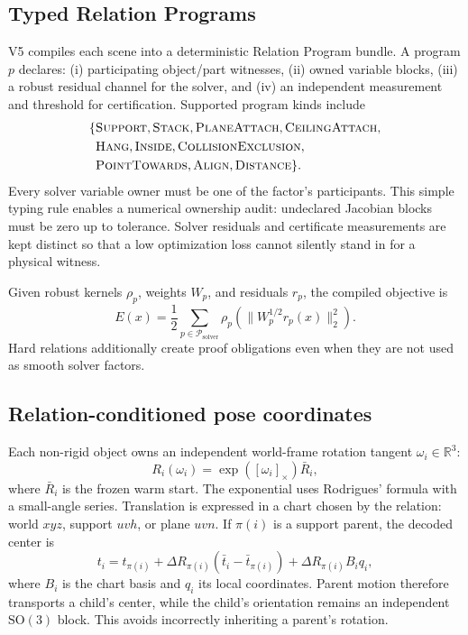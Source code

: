 \documentclass[10pt,twocolumn]{article}
\begin{document}
\subsection{Typed Relation Programs}

V5 compiles each scene into a deterministic Relation Program bundle.  A
program $p$ declares: (i) participating object/part witnesses, (ii) owned
variable blocks, (iii) a robust residual channel for the solver, and (iv) an
independent measurement and threshold for certification.  Supported program
kinds include
\begin{equation}
\begin{aligned}
\{&\textsc{Support},\textsc{Stack},\textsc{PlaneAttach},
\textsc{CeilingAttach},\\
&\textsc{Hang},\textsc{Inside},\textsc{CollisionExclusion},\\
&\textsc{PointTowards},\textsc{Align},\textsc{Distance}\}.
\end{aligned}
\end{equation}
Every solver variable owner must be one of the factor's participants.  This
simple typing rule enables a numerical ownership audit: undeclared Jacobian
blocks must be zero up to tolerance.  Solver residuals and certificate
measurements are kept distinct so that a low optimization loss cannot silently
stand in for a physical witness.

Given robust kernels $\rho_p$, weights $W_p$, and residuals $r_p$, the compiled
objective is
\begin{equation}
  E(x)=\frac{1}{2}\sum_{p\in\mathcal{P}_{\mathrm{solver}}}
  \rho_p\!\left(\|W_p^{1/2}r_p(x)\|_2^2\right).
  \label{eq:objective}
\end{equation}
Hard relations additionally create proof obligations even when they are not
used as smooth solver factors.

\subsection{Relation-conditioned pose coordinates}

Each non-rigid object owns an independent world-frame rotation tangent
$\omega_i\in\mathbb{R}^3$:
\begin{equation}
  R_i(\omega_i)=\exp([\omega_i]_{\times})\bar R_i,
  \label{eq:so3}
\end{equation}
where $\bar R_i$ is the frozen warm start.  The exponential uses Rodrigues'
formula with a small-angle series.  Translation is expressed in a chart chosen
by the relation: world $xyz$, support $uvh$, or plane $uvn$.  If $\pi(i)$ is a
support parent, the decoded center is
\begin{equation}
  t_i=t_{\pi(i)}+\Delta R_{\pi(i)}
  (\bar t_i-\bar t_{\pi(i)})+
  \Delta R_{\pi(i)}B_iq_i,
  \label{eq:decode}
\end{equation}
where $B_i$ is the chart basis and $q_i$ its local coordinates.  Parent motion
therefore transports a child's center, while the child's orientation remains
an independent $\mathrm{SO}(3)$ block.  This avoids incorrectly inheriting a
parent's rotation.
\end{document}
